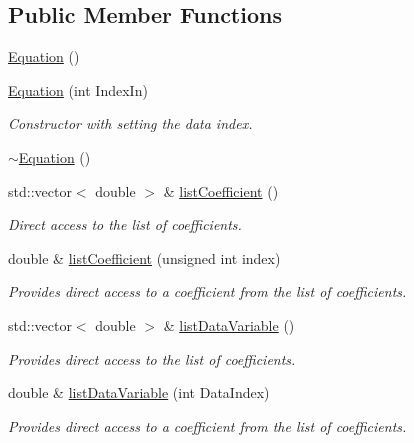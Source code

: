 \subsection*{Public Member Functions}
\begin{DoxyCompactItemize}
\item 
\hyperlink{classosea_1_1ofreq_1_1_equation_a68511fc719250ed80f86c50de9136733}{Equation} ()
\item 
\hyperlink{classosea_1_1ofreq_1_1_equation_a37fec641aec75302c37590d191421790}{Equation} (int Index\-In)
\begin{DoxyCompactList}\small\item\em Constructor with setting the data index. \end{DoxyCompactList}\item 
\hyperlink{classosea_1_1ofreq_1_1_equation_a097243d0dfd608330fc91f115a0d15bb}{$\sim$\-Equation} ()
\item 
std\-::vector$<$ double $>$ \& \hyperlink{classosea_1_1ofreq_1_1_equation_a40be3415ddc7ebc7aa93829f3eb750f0}{list\-Coefficient} ()
\begin{DoxyCompactList}\small\item\em Direct access to the list of coefficients. \end{DoxyCompactList}\item 
double \& \hyperlink{classosea_1_1ofreq_1_1_equation_acce479a17f90df340bcf9cabf06258a2}{list\-Coefficient} (unsigned int index)
\begin{DoxyCompactList}\small\item\em Provides direct access to a coefficient from the list of coefficients. \end{DoxyCompactList}\item 
std\-::vector$<$ double $>$ \& \hyperlink{classosea_1_1ofreq_1_1_equation_a47c6d4a1c29fb55c16d0a9bd3a739e0a}{list\-Data\-Variable} ()
\begin{DoxyCompactList}\small\item\em Provides direct access to the list of coefficients. \end{DoxyCompactList}\item 
double \& \hyperlink{classosea_1_1ofreq_1_1_equation_ab9b8c047c7567253a5e51ec11c3a3a41}{list\-Data\-Variable} (int Data\-Index)
\begin{DoxyCompactList}\small\item\em Provides direct access to a coefficient from the list of coefficients. \end{DoxyCompactList}\item 

\end{DoxyCompactItemize}
